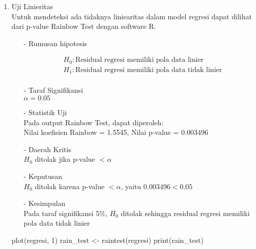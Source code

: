 \begin{enumerate}
\begin{enumerate}
    \item Uji Linieritas \\
    \noindent Untuk mendeteksi ada tidaknya liniearitas dalam model regresi dapat dilihat dari p-value Rainbow Test dengan software R.
    \begin{test}{
        \begin{enumerate}
        \item[-] Rumusan hipotesis \\
        \begin{fleqn}[\parindent]
            \begin{equation*}
            \begin{split}
            &H_0 : \text{Residual regresi memiliki pola data linier} \\ 
            &H_1 : \text{Residual regresi memiliki pola data tidak linier} \\
            \end{split}
            \end{equation*}
        \end{fleqn}
    
        \item[-] Taraf Signifikansi \\
        $\alpha = 0.05$
    
        \item[-] Statistik Uji \\
        Pada output Rainbow Test, dapat diperoleh: \\
        Nilai koefisien Rainbow = 1.5545, Nilai p-value = 0.003496
    
        \item[-] Daerah Kritis \\
        $H_0$ ditolak jika p-value $< \alpha$
    
        \item[-] Keputusan \\
        $H_0$ ditolak karena p-value $< \alpha$, yaitu $0.003496 < 0.05$
    
        \item[-] Kesimpulan \\
        Pada taraf signifikansi 5\%, $H_0$ ditolak sehingga residual regresi memiliki pola data tidak linier
    \end{enumerate}
    }
plot(regresi, 1)
rain_test <- raintest(regresi)
print(rain_test)
    \end{test}


\end{enumerate}
\end{enumerate}
